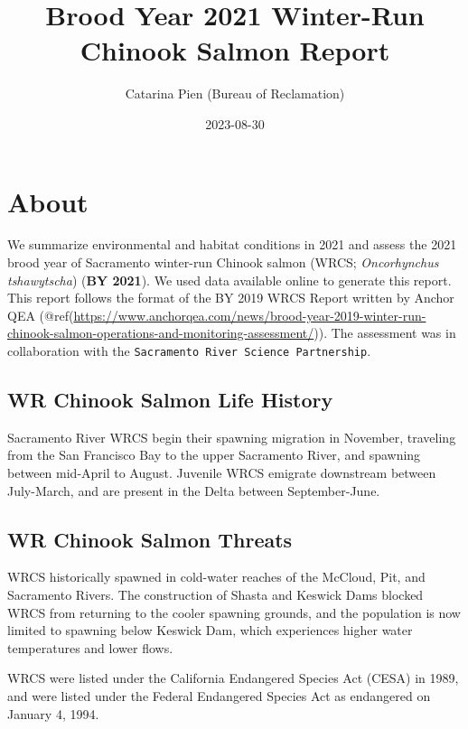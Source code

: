 \documentclass[
]{book}
\title{Brood Year 2021 Winter-Run Chinook Salmon Report}
\author{Catarina Pien (Bureau of Reclamation)}
\date{2023-08-30}
\theoremstyle{definition}
\theoremstyle{definition}
\theoremstyle{definition}
\theoremstyle{definition}
\theoremstyle{remark}
\begin{document}
\maketitle

{
\setcounter{tocdepth}{1}
\tableofcontents
}
\hypertarget{about}{%
\chapter{About}\label{about}}

We summarize environmental and habitat conditions in 2021 and assess the 2021 brood year of Sacramento winter-run Chinook salmon (WRCS; \emph{Oncorhynchus tshawytscha}) (\textbf{BY 2021}). We used data available online to generate this report. This report follows the format of the BY 2019 WRCS Report written by Anchor QEA (@ref(\url{https://www.anchorqea.com/news/brood-year-2019-winter-run-chinook-salmon-operations-and-monitoring-assessment/})). The assessment was in collaboration with the \texttt{Sacramento\ River\ Science\ Partnership}.

\hypertarget{wr-chinook-salmon-life-history}{%
\section{WR Chinook Salmon Life History}\label{wr-chinook-salmon-life-history}}

Sacramento River WRCS begin their spawning migration in November, traveling from the San Francisco Bay to the upper Sacramento River, and spawning between mid-April to August. Juvenile WRCS emigrate downstream between July-March, and are present in the Delta between September-June.

\hypertarget{wr-chinook-salmon-threats}{%
\section{WR Chinook Salmon Threats}\label{wr-chinook-salmon-threats}}

WRCS historically spawned in cold-water reaches of the McCloud, Pit, and Sacramento Rivers. The construction of Shasta and Keswick Dams blocked WRCS from returning to the cooler spawning grounds, and the population is now limited to spawning below Keswick Dam, which experiences higher water temperatures and lower flows.

WRCS were listed under the California Endangered Species Act (CESA) in 1989, and were listed under the Federal Endangered Species Act as endangered on January 4, 1994.
\end{document}
